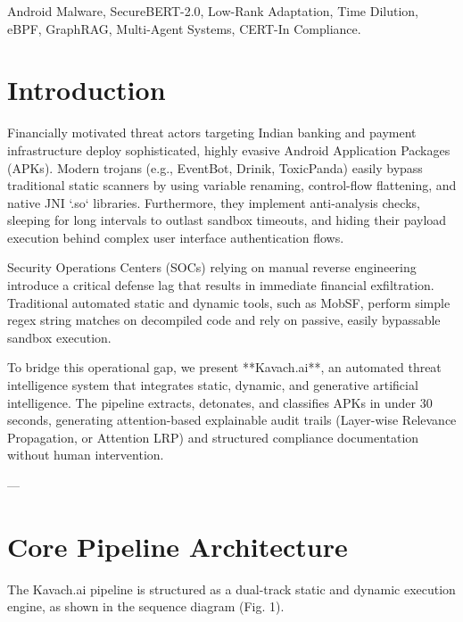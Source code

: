 \documentclass[conference]{IEEEtran}
\begin{document}
\begin{IEEEkeywords}
Android Malware, SecureBERT-2.0, Low-Rank Adaptation, Time Dilution, eBPF, GraphRAG, Multi-Agent Systems, CERT-In Compliance.
\end{IEEEkeywords}

\section{Introduction}
Financially motivated threat actors targeting Indian banking and payment infrastructure deploy sophisticated, highly evasive Android Application Packages (APKs). Modern trojans (e.g., EventBot, Drinik, ToxicPanda) easily bypass traditional static scanners by using variable renaming, control-flow flattening, and native JNI `.so` libraries. Furthermore, they implement anti-analysis checks, sleeping for long intervals to outlast sandbox timeouts, and hiding their payload execution behind complex user interface authentication flows.

Security Operations Centers (SOCs) relying on manual reverse engineering introduce a critical defense lag that results in immediate financial exfiltration. Traditional automated static and dynamic tools, such as MobSF, perform simple regex string matches on decompiled code and rely on passive, easily bypassable sandbox execution. 

To bridge this operational gap, we present **Kavach.ai**, an automated threat intelligence system that integrates static, dynamic, and generative artificial intelligence. The pipeline extracts, detonates, and classifies APKs in under 30 seconds, generating attention-based explainable audit trails (Layer-wise Relevance Propagation, or Attention LRP) and structured compliance documentation without human intervention.

---

\section{Core Pipeline Architecture}

The Kavach.ai pipeline is structured as a dual-track static and dynamic execution engine, as shown in the sequence diagram (Fig. 1).
\end{document}
